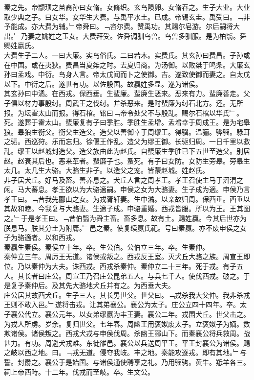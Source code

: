 \documentclass{zhvt-classic}
\begin{document}
\hspace*{2em}秦之先。帝颛顼之苗裔孙曰女脩。女脩织。玄鸟陨卵。女脩吞之。生子大业。大业取少典之子。曰女华。女华生大费。与禹平水土。已成。帝锡玄圭。禹受曰。﹁非予能成。亦大费为辅。﹂帝舜曰。﹁咨尔费。赞禹功。其赐尔皂游。尔后嗣将大出。﹂乃妻之姚姓之玉女。大费拜受。佐舜调驯鸟兽。鸟兽多驯服。是为柏翳。舜赐姓嬴氏。\\
\hspace*{2em}大费生子二人。一曰大廉。实鸟俗氏。二曰若木。实费氏。其玄孙曰费昌。子孙或在中国。或在夷狄。费昌当夏桀之时。去夏归商。为汤御。以败桀于鸣条。大廉玄孙曰孟戏。中衍。鸟身人言。帝太戊闻而卜之使御。吉。遂致使御而妻之。自太戊以下。中衍之后。遂世有功。以佐殷国。故嬴姓多显。遂为诸侯。\\
\hspace*{2em}其玄孙曰中潏。在西戎。保西垂。生蜚廉。蜚廉生恶来。恶来有力。蜚廉善走。父子俱以材力事殷纣。周武王之伐纣。并杀恶来。是时蜚廉为纣石北方。还。无所报。为坛霍太山而报。得石棺。铭曰﹁帝令处父不与殷乱。赐尔石棺以华氏﹂。死。遂葬于霍太山。蜚廉复有子曰季胜。季胜生孟增。孟增幸于周成王。是为宅皋狼。皋狼生衡父。衡父生造父。造父以善御幸于周缪王。得骥。温骊。骅骝。騄耳之驷。西巡狩。乐而忘归。徐偃王作乱。造父为缪王御。长驱归周。一日千里以救乱。缪王以赵城封造父。造父族由此为赵氏。自蜚廉生季胜已下五世至造父。别居赵。赵衰其后也。恶来革者。蜚廉子也。蚤死。有子曰女防。女防生旁皋。旁皋生太几。太几生大骆。大骆生非子。以造父之宠。皆蒙赵城。姓赵氏。\\
\hspace*{2em}非子居犬丘。好马及畜。善养息之。犬丘人言之周孝王。孝王召使主马于汧渭之闲。马大蕃息。孝王欲以为大骆適嗣。申侯之女为大骆妻。生子成为適。申侯乃言孝王曰。﹁昔我先郦山之女。为戎胥轩妻。生中潏。以亲故归周。保西垂。西垂以其故和睦。今我复与大骆妻。生適子成。申骆重婚。西戎皆服。所以为王。王其图之。﹂于是孝王曰。﹁昔伯翳为舜主畜。畜多息。故有土。赐姓嬴。今其后世亦为朕息马。朕其分土为附庸。﹂邑之秦。使复续嬴氏祀。号曰秦嬴。亦不废申侯之女子为骆適者。以和西戎。\\
\hspace*{2em}秦嬴生秦侯。秦侯立十年。卒。生公伯。公伯立三年。卒。生秦仲。\\
\hspace*{2em}秦仲立三年。周厉王无道。诸侯或叛之。西戎反王室。灭犬丘大骆之族。周宣王即位。乃以秦仲为大夫。诛西戎。西戎杀秦仲。秦仲立二十三年。死于戎。有子五人。其长者曰庄公。周宣王乃召庄公昆弟五人。与兵七千人。使伐西戎。破之。于是复予秦仲后。及其先大骆地犬丘并有之。为西垂大夫。\\
\hspace*{2em}庄公居其故西犬丘。生子三人。其长男世父。世父曰。﹁戎杀我大父仲。我非杀戎王则不敢入邑。﹂遂将击戎。让其弟襄公。襄公为太子。庄公立四十四年。卒。太子襄公代立。襄公元年。以女弟缪嬴为丰王妻。襄公二年。戎围犬丘。世父击之。为戎人所虏。岁余。复归世父。七年春。周幽王用褒姒废太子。立褒姒子为嫡。数欺诸侯。诸侯叛之。西戎犬戎与申侯伐周。杀幽王郦山下。而秦襄公将兵救周。战甚力。有功。周避犬戎难。东徙雒邑。襄公以兵送周平王。平王封襄公为诸侯。赐之岐以西之地。曰。﹁戎无道。侵夺我岐。丰之地。秦能攻逐戎。即有其地。﹂与誓。封爵之。襄公于是始国。与诸侯通使聘享之礼。乃用骝驹。黄牛。羝羊各三。祠上帝西畤。十二年。伐戎而至岐。卒。生文公。\\
\end{document}
